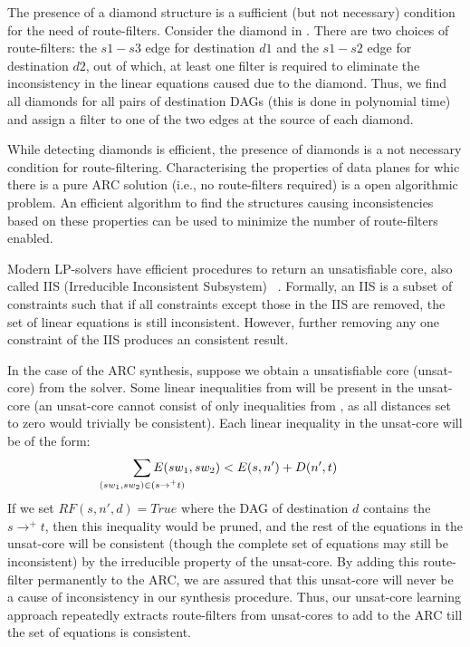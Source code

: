 The presence of a diamond structure is a sufficient (but not 
necessary) condition for the need of route-filters. Consider
the diamond in . There are two choices
of route-filters: the $s1-s3$ edge for destination $d1$ 
and the $s1-s2$ edge for destination $d2$, out of which,
at least one filter is required to eliminate the 
inconsistency in the linear equations caused due to the diamond.
Thus, we find all diamonds for all pairs of destination
DAGs (this is done in polynomial time) and assign a filter
to one of the two edges at the source of each diamond. 

While detecting diamonds is efficient, the
presence of diamonds is a not 
necessary condition for route-filtering.
Characterising the properties of data planes for whic there is
a pure ARC solution (i.e., no route-filters
required) is a open algorithmic
problem. An 
efficient algorithm to find the structures causing 
inconsistencies based on these properties 
can be used to minimize the number of route-filters enabled.  

Modern LP-solvers have efficient procedures to return an
unsatisfiable core, also called IIS (Irreducible Inconsistent Subsystem)
~\cite{iis}. Formally, an IIS is a subset of constraints such that
if all constraints except those in the IIS are removed, the set of
linear equations is still inconsistent. However, further removing 
any one constraint of the IIS produces an consistent result. 

In the case of the ARC synthesis, suppose we obtain
a unsatisfiable core (unsat-core) from the solver. 
Some linear inequalities 
from  will be present in the unsat-core 
(an unsat-core cannot consist of only 
inequalities from , as all distances set to zero
would trivially be consistent). Each linear inequality
in the unsat-core will be of the form:
\begin{eqnarray}
	\sum_{\mathclap{\substack{(sw_1, sw_2) \in (s \rightarrow^+ t)}}} 
		E(sw_1, sw_2) < E(s, n') + D(n', t)  \nonumber
\end{eqnarray}
If we set $RF(s,n',d) = True$ where the DAG of destination $d$
contains the $s \rightarrow^+ t$, then this inequality would be pruned,
and the rest of the equations in the unsat-core will be consistent (though
the complete set of equations may still be inconsistent) by the 
irreducible property of the unsat-core. By adding this route-filter
permanently to the ARC, we are assured that this unsat-core will 
never be a cause of inconsistency in our synthesis procedure. 
Thus, our unsat-core learning approach 
repeatedly extracts route-filters 
from unsat-cores to add to the ARC
till the set of equations is consistent. 

